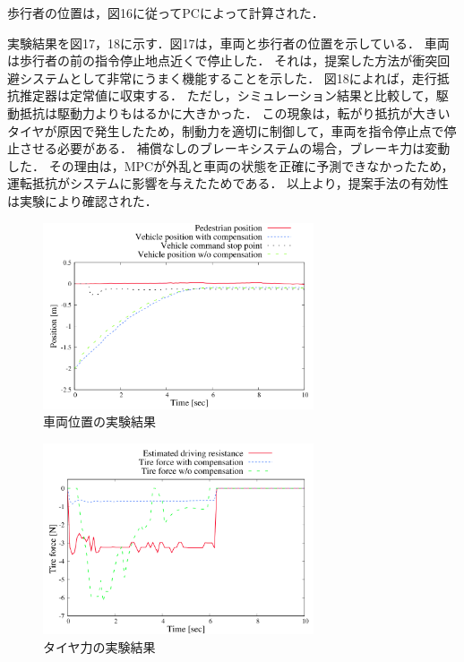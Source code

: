 歩行者の位置は，図16に従ってPCによって計算された．

実験結果を図17，18に示す．図17は，車両と歩行者の位置を示している． 車両は歩行者の前の指令停止地点近くで停止した． それは，提案した方法が衝突回避システムとして非常にうまく機能することを示した． 図18によれば，走行抵抗推定器は定常値に収束する． ただし，シミュレーション結果と比較して，駆動抵抗は駆動力よりもはるかに大きかった． この現象は，転がり抵抗が大きいタイヤが原因で発生したため，制動力を適切に制御して，車両を指令停止点で停止させる必要がある． 補償なしのブレーキシステムの場合，ブレーキ力は変動した． その理由は，MPCが外乱と車両の状態を正確に予測できなかったため，運転抵抗がシステムに影響を与えたためである． 以上より，提案手法の有効性は実験により確認された．
\begin{figure}[H]
    \centering
    \includegraphics[width=8cm]{./fig/fig17.png}
    \caption{車両位置の実験結果}
\end{figure}
\begin{figure}[H]
    \centering
    \includegraphics[width=8cm]{./fig/fig18.png}
    \caption{タイヤ力の実験結果}
\end{figure}
